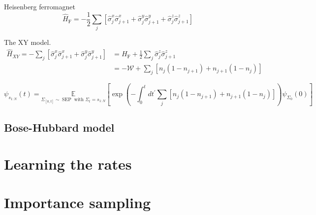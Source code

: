 Heisenberg ferromagnet
\begin{equation}
\hat H_{\mathrm{F}}=-\frac{1}{2} \sum_{j}\left[\hat{\sigma}_{j}^{x} \hat{\sigma}_{j+1}^{x}+\hat{\sigma}_{j}^{y} \hat{\sigma}_{j+1}^{y}+\hat{\sigma}_{j}^{z} \hat{\sigma}_{j+1}^{z}\right]
\end{equation}

The XY model.
\begin{equation}
\begin{aligned} 
\hat H_{X Y}=-\sum_{j}\left[\hat{\sigma}_{j}^{x} \hat{\sigma}_{j+1}^{x}+\hat{\sigma}_{j}^{y} \hat{\sigma}_{j+1}^{y}\right] &=H_{\mathrm{F}}+\frac{1}{2} \sum_{j} \hat{\sigma}_{j}^{z} \hat{\sigma}_{j+1}^{z} \\ 						&=-\mathcal{W}+\sum_{j}\left[n_{j}\left(1-n_{j+1}\right)+n_{j+1}\left(1-n_{j}\right)\right] 
\end{aligned}
\end{equation}

\begin{equation}
\psi_{s_{1: N}}(t)=\underset{\Sigma_{[0, t]} \sim \operatorname{SEP} \text{ with } \Sigma_{t}=s_{1: N}}{\mathbb{E}}
\left[\exp \left(-\int_{0}^{t} d t^{\prime} \sum_{j}\left[n_{j}\left(1-n_{j+1}\right)+n_{j+1}\left(1-n_{j}\right)\right]\right) \psi_{\Sigma_{0}}(0)\right]
\end{equation}

\subsection{Bose-Hubbard model}
\label{sec:res-bhm}

\section{Learning the rates}

\section{Importance sampling}









